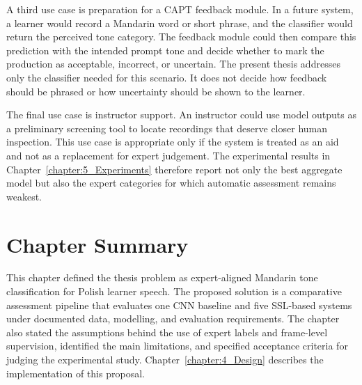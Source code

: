 A third use case is preparation for a CAPT feedback module. In a future system,
a learner would record a Mandarin word or short phrase, and the classifier would
return the perceived tone category. The feedback module could then compare this
prediction with the intended prompt tone and decide whether to mark the
production as acceptable, incorrect, or uncertain. The present thesis addresses
only the classifier needed for this scenario. It does not decide how feedback
should be phrased or how uncertainty should be shown to the learner.

The final use case is instructor support. An instructor could use model outputs
as a preliminary screening tool to locate recordings that deserve closer human
inspection. This use case is appropriate only if the system is treated as an aid
and not as a replacement for expert judgement. The experimental results in
Chapter~\ref{chapter:5_Experiments} therefore report not only the best aggregate
model but also the expert categories for which automatic assessment remains weakest.

\section{Chapter Summary}
\label{sec:proposal:summary}

This chapter defined the thesis problem as expert-aligned Mandarin tone
classification for Polish learner speech. The proposed solution is a comparative
assessment pipeline that evaluates one CNN baseline and five SSL-based systems
under documented data, modelling, and evaluation requirements. The chapter also
stated the assumptions behind the use of expert labels and frame-level
supervision, identified the main limitations, and specified acceptance criteria
for judging the experimental study. Chapter~\ref{chapter:4_Design} describes
the implementation of this proposal.
